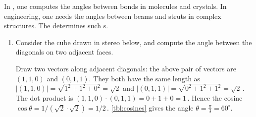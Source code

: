 \begin{example} 
In , one computes the angles between bonds in molecules and crystals.  
In engineering, one needs the angles between beams and struts in complex structures.
The  determines such s.
\begin{enumerate}
\item Consider the cube drawn in stereo below, and compute the angle between the diagonals on two adjacent faces.
\begin{center}
 {}
\end{center}
\begin{solution} 
Draw two vectors along adjacent diagonals: the above pair of vectors are \((1,1,0)\) and \((0,1,1)\).
They both have the same length as \(|(1,1,0)|=\sqrt{1^2+1^2+0^2}=\sqrt2\) and \(|(0,1,1)|=\sqrt{0^2+1^2+1^2}=\sqrt2\)\,.
The dot product is \((1,1,0)\cdot(0,1,1)=0+1+0=1\)\,.
Hence the cosine \(\cos\theta=1/(\sqrt2\cdot\sqrt2)=1/2\)\,.
\cref{tbl:cosines} gives the angle \(\theta=\frac\pi3=60^\circ\).
\end{solution}


\end{enumerate}
\end{example}
